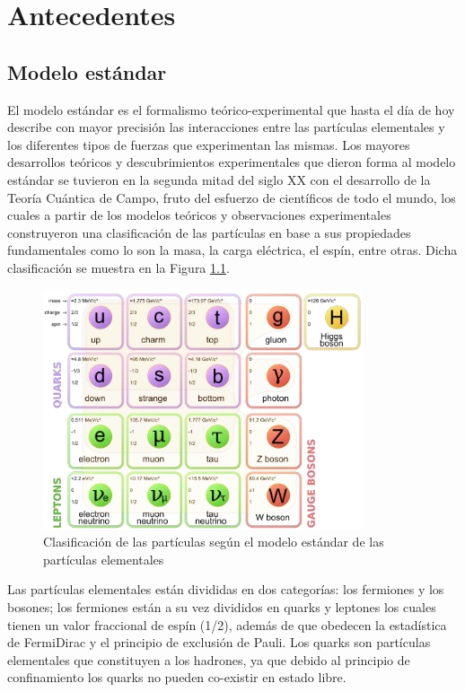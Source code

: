 \chapter{Antecedentes}
\section{Modelo estándar}

El modelo estándar es el formalismo teórico-experimental que hasta el día de hoy describe con mayor precisión las interacciones entre las partículas elementales y los diferentes tipos de fuerzas que experimentan las mismas. Los mayores desarrollos teóricos y descubrimientos experimentales que dieron forma al modelo estándar se tuvieron en la segunda mitad del siglo XX con el desarrollo de la Teoría Cuántica de Campo, fruto del esfuerzo de científicos de todo el mundo, los cuales a partir de los modelos teóricos y observaciones experimentales construyeron una clasificación de las partículas en base a sus propiedades fundamentales como lo son la masa, la carga eléctrica, el espín, entre otras. Dicha clasificación se muestra en la Figura \ref{fig:estandard_model}. 
\begin{figure}
    \centering
    \includegraphics[width=0.84\textwidth]{ANTECEDENTES/standard_model.png}
    \caption{Clasificación de las partículas según el modelo estándar de las partículas elementales}
    \label{fig:estandard_model}
\end{figure}

Las partículas elementales están divididas en dos categorías: los fermiones y los
bosones; los fermiones están a su vez divididos en quarks y leptones los cuales tienen un valor fraccional de espín (1/2), además de que obedecen la estadística de FermiDirac y el principio de exclusión de Pauli. Los quarks son partículas elementales que constituyen a los hadrones, ya que debido al principio de confinamiento los quarks no pueden co-existir en estado libre.

